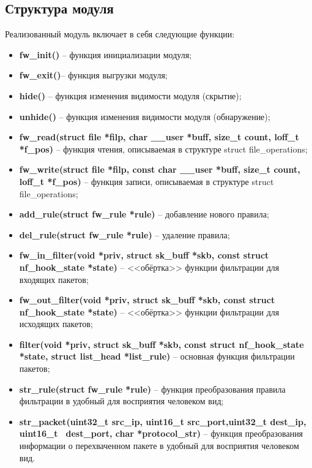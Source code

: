 \subsection{Структура модуля}
Реализованный модуль включает в себя следующие функции:
\begin{itemize}
	\item \textbf{fw\_init()} -- функция инициализации модуля;
	
	\item \textbf{fw\_exit()}-- функция выгрузки модуля;
	
	\item \textbf{hide()} -- функция изменения видимости модуля (скрытие);
	
	\item \textbf{unhide()} -- функция изменения видимости модуля (обнаружение);
	
	\item \textbf{fw\_read(struct file *filp, char \_\_user *buff, size\_t count, loff\_t *f\_pos)} -- функция чтения, описываемая в структуре struct file\_operations;
	
	\item \textbf{fw\_write(struct file *filp, const char \_\_user *buff, size\_t count, loff\_t *f\_pos)} -- функция записи, описываемая в структуре struct file\_operations;
	
	\item \textbf{add\_rule(struct fw\_rule *rule)} -- добавление нового правила;
	
	\item \textbf{del\_rule(struct fw\_rule *rule)} -- удаление правила;
	
	\item \textbf{fw\_in\_filter(void *priv, struct sk\_buff *skb, const struct nf\_hook\_state *state)} -- <<обёртка>> функции фильтрации для входящих пакетов;
	
	\item \textbf{fw\_out\_filter(void *priv, struct sk\_buff *skb, const struct nf\_hook\_state *state)} -- <<обёртка>> функции фильтрации для исходящих пакетов;
	
	\item \textbf{filter(void *priv, struct sk\_buff *skb, const struct nf\_hook\_state *state,
	struct list\_head *list\_rule)} -- основная функция фильтрации пакетов;
	
	\item \textbf{str\_rule(struct fw\_rule *rule)} -- функция преобразования правила фильтрации в удобный для восприятия человеком вид;
	
	\item \textbf{str\_packet(uint32\_t src\_ip, uint16\_t src\_port,uint32\_t dest\_ip, uint16\_t \, dest\_port, char *protocol\_str)} -- функция преобразования информации о перехваченном пакете в удобный для восприятия человеком вид. \newline
\end{itemize}
